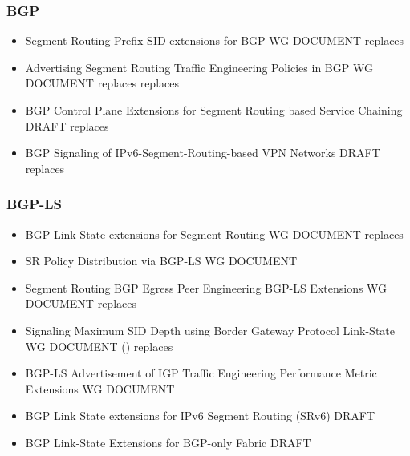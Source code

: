 {\subsubsection{BGP}
\begin{itemize}
    \item Segment Routing Prefix SID extensions for BGP WG DOCUMENT \cite{ietf-idr-bgp-prefix-sid-27} replaces \cite{keyupate-idr-bgp-prefix-sid-05}
    \item Advertising Segment Routing Traffic Engineering Policies in BGP WG DOCUMENT \cite{ietf-idr-segment-routing-te-policy-04} replaces \cite{previdi-idr-segment-routing-te-policy-07} replaces \cite{sreekantiah-idr-segment-routing-te-00}
    \item BGP Control Plane Extensions for Segment Routing based Service Chaining DRAFT \cite{dawra-idr-bgp-sr-service-chaining-02} replaces \cite{dawra-spring-bgp-sr-service-chaining-00}
    \item BGP Signaling of IPv6-Segment-Routing-based VPN Networks DRAFT \cite{dawra-idr-srv6-vpn-04} replaces \cite{dawra-bgp-srv6-vpn-00}
\end{itemize}    
\subsubsection{BGP-LS}
\begin{itemize}
    \item BGP Link-State extensions for Segment Routing WG DOCUMENT \cite{ietf-idr-bgp-ls-segment-routing-ext-08} replaces \cite{gredler-idr-bgp-ls-segment-routing-ext-04}
    \item SR Policy Distribution via BGP-LS WG DOCUMENT \cite{ietf-idr-te-lsp-distribution-09}
    \item Segment Routing BGP Egress Peer Engineering BGP-LS Extensions WG DOCUMENT \cite{ietf-idr-bgpls-segment-routing-epe-15} replaces \cite{previdi-idr-bgpls-segment-routing-epe-03}
    \item Signaling Maximum SID Depth using Border Gateway Protocol Link-State WG DOCUMENT () \cite{ietf-idr-bgp-ls-segment-routing-msd-01} replaces \cite{tantsura-idr-bgp-ls-segment-routing-msd-05}
    \item BGP-LS Advertisement of IGP Traffic Engineering Performance Metric Extensions WG DOCUMENT \cite{ietf-idr-te-pm-bgp-10}
    \item BGP Link State extensions for IPv6 Segment Routing (SRv6) DRAFT \cite{dawra-idr-bgpls-srv6-ext-03}
    \item BGP Link-State Extensions for BGP-only Fabric DRAFT \cite{ketant-idr-bgp-ls-bgp-only-fabric-00}
\end{itemize}    
}
